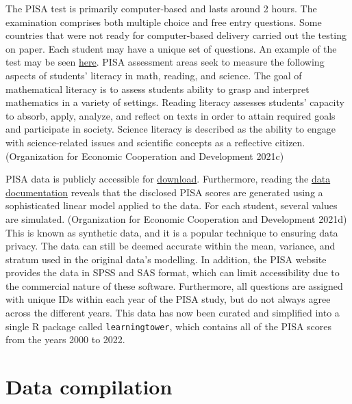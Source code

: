 The PISA test is primarily computer-based and lasts around 2 hours. The examination comprises both multiple choice and free entry questions. Some countries that were not ready for computer-based delivery carried out the testing on paper. Each student may have a unique set of questions. An example of the test may be seen \href{https://www.oecd.org/pisa/test/}{here}. PISA assessment areas seek to measure the following aspects of students' literacy in math, reading, and science. The goal of mathematical literacy is to assess students ability to grasp and interpret mathematics in a variety of settings. Reading literacy assesses students' capacity to absorb, apply, analyze, and reflect on texts in order to attain required goals and participate in society. Science literacy is described as the ability to engage with science-related issues and scientific concepts as a reflective citizen. (Organization for Economic Cooperation and Development 2021c)

PISA data is publicly accessible for \href{https://www.oecd.org/pisa/data/}{download}. Furthermore, reading the \href{https://www.oecd.org/pisa/data/pisa2018technicalreport/Ch.09-Scaling-PISA-Data.pdf}{data documentation} reveals that the disclosed PISA scores are generated using a sophisticated linear model applied to the data. For each student, several values are simulated. (Organization for Economic Cooperation and Development 2021d) This is known as synthetic data, and it is a popular technique to ensuring data privacy. The data can still be deemed accurate within the mean, variance, and stratum used in the original data's modelling. In addition, the PISA website provides the data in SPSS and SAS format, which can limit accessibility due to the commercial nature of these software. Furthermore, all questions are assigned with unique IDs within each year of the PISA study, but do not always agree across the different years. This data has now been curated and simplified into a single R package called \texttt{learningtower}, which contains all of the PISA scores from the years 2000 to 2022.

\hypertarget{data-compilation}{%
\section{Data compilation}\label{data-compilation}}

